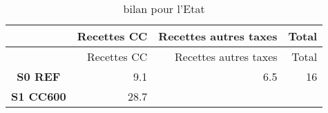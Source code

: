 
\begin{longtable}[]{@{}crrr@{}}
\caption{bilan pour l'Etat}\tabularnewline
\toprule
\begin{minipage}[b]{0.26\columnwidth}\centering\strut
~\strut
\end{minipage} & \begin{minipage}[b]{0.17\columnwidth}\raggedleft\strut
Recettes CC\strut
\end{minipage} & \begin{minipage}[b]{0.30\columnwidth}\raggedleft\strut
Recettes autres taxes\strut
\end{minipage} & \begin{minipage}[b]{0.09\columnwidth}\raggedleft\strut
Total\strut
\end{minipage}\tabularnewline
\midrule
\endfirsthead
\toprule
\begin{minipage}[b]{0.26\columnwidth}\centering\strut
~\strut
\end{minipage} & \begin{minipage}[b]{0.17\columnwidth}\raggedleft\strut
Recettes CC\strut
\end{minipage} & \begin{minipage}[b]{0.30\columnwidth}\raggedleft\strut
Recettes autres taxes\strut
\end{minipage} & \begin{minipage}[b]{0.09\columnwidth}\raggedleft\strut
Total\strut
\end{minipage}\tabularnewline
\midrule
\endhead
\begin{minipage}[t]{0.26\columnwidth}\centering\strut
\textbf{S0 REF}\strut
\end{minipage} & \begin{minipage}[t]{0.17\columnwidth}\raggedleft\strut
9.1\strut
\end{minipage} & \begin{minipage}[t]{0.30\columnwidth}\raggedleft\strut
6.5\strut
\end{minipage} & \begin{minipage}[t]{0.09\columnwidth}\raggedleft\strut
16\strut
\end{minipage}\tabularnewline
\begin{minipage}[t]{0.26\columnwidth}\centering\strut
\textbf{S1 CC600}\strut
\end{minipage} & \begin{minipage}[t]{0.17\columnwidth}\raggedleft\strut
28.7\strut
\end{minipage} & \begin{minipage}[t]{0.30\columnwidth}\raggedleft\strut

\end{minipage}
\end{longtable}
